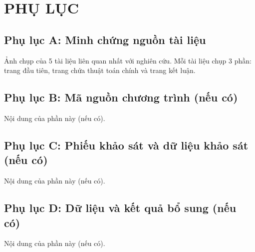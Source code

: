 
\chapter*{PHỤ LỤC}
{}

\section*{Phụ lục A: Minh chứng nguồn tài liệu}
{}

Ảnh chụp của 5 tài liệu liên quan nhất với nghiên cứu. Mỗi tài liệu chụp 3 phần: trang đầu tiên, trang chứa thuật toán chính và trang kết luận.

\newpage
\section*{Phụ lục B: Mã nguồn chương trình (nếu có)}
{}

Nội dung của phần này (nếu có).

\newpage
\section*{Phụ lục C: Phiếu khảo sát và dữ liệu khảo sát (nếu có)}
{}

Nội dung của phần này (nếu có).

\newpage
\section*{Phụ lục D: Dữ liệu và kết quả bổ sung (nếu có)}
{}

Nội dung của phần này (nếu có).
